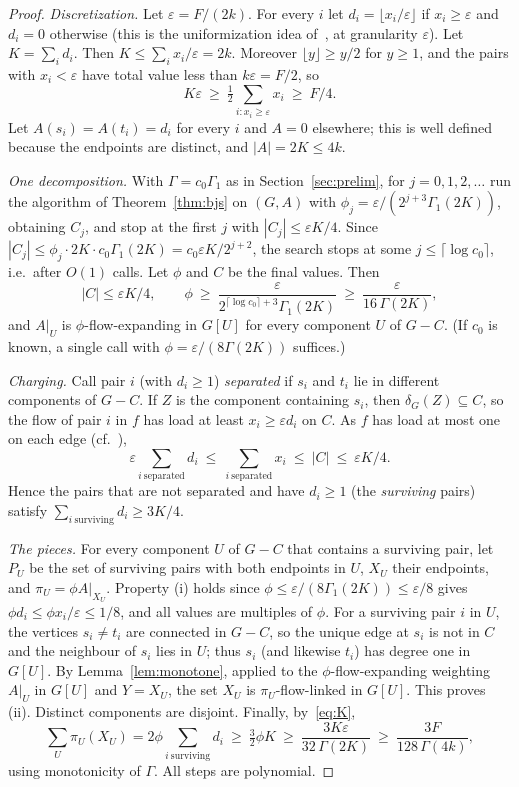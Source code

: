\documentclass[11pt,letterpaper]{article}
\theoremstyle{definition}
\newcommand{\eps}{\varepsilon}
\begin{document}
\begin{proof}
\emph{Discretization.} Let $\eps=F/(2k)$. For every $i$ let $d_i=\lfloor x_i/\eps\rfloor$ if
$x_i\ge\eps$ and $d_i=0$ otherwise (this is the uniformization idea
of~\cite[Lemma~1.1]{CKS05}, at granularity $\eps$). Let $K=\sum_id_i$. Then
$K\le\sum_ix_i/\eps=2k$. Moreover $\lfloor y\rfloor\ge y/2$ for $y\ge1$, and the pairs with
$x_i<\eps$ have total value less than $k\eps=F/2$, so
\begin{equation}\label{eq:K}
K\eps\ \ge\ \tfrac12\textstyle\sum_{i:x_i\ge\eps}x_i\ \ge\ F/4 .
\end{equation}
Let $A(s_i)=A(t_i)=d_i$ for every $i$ and $A=0$ elsewhere; this is well defined because the
endpoints are distinct, and $|A|=2K\le4k$.

\emph{One decomposition.} With $\Gamma=c_0\Gamma_1$ as in Section~\ref{sec:prelim}, for
$j=0,1,2,\dots$ run the algorithm of Theorem~\ref{thm:bjs} on $(G,A)$ with
$\phi_j=\eps/(2^{j+3}\Gamma_1(2K))$, obtaining $C_j$, and stop at the first $j$ with
$|C_j|\le\eps K/4$. Since $|C_j|\le\phi_j\cdot2K\cdot c_0\Gamma_1(2K)=c_0\eps K/2^{j+2}$, the
search stops at some $j\le\lceil\log c_0\rceil$, i.e.\ after $O(1)$ calls. Let $\phi$ and $C$
be the final values. Then
\[
|C|\le\eps K/4,\qquad \phi\ \ge\ \frac{\eps}{2^{\lceil\log c_0\rceil+3}\Gamma_1(2K)}\ \ge\
\frac{\eps}{16\,\Gamma(2K)},
\]
and $A|_U$ is $\phi$-flow-expanding in $G[U]$ for every component $U$ of $G-C$. (If $c_0$ is
known, a single call with $\phi=\eps/(8\Gamma(2K))$ suffices.)

\emph{Charging.} Call pair $i$ (with $d_i\ge1$) \emph{separated} if $s_i$ and $t_i$ lie in
different components of $G-C$. If $Z$ is the component containing $s_i$, then
$\delta_G(Z)\subseteq C$, so the flow of pair $i$ in $f$ has load at least $x_i\ge\eps d_i$ on
$C$. As $f$ has load at most one on each edge (cf.~\cite[Lemma~2.2]{CKS05}),
\[
\eps\textstyle\sum_{i\ \mathrm{separated}}d_i\ \le\ \sum_{i\ \mathrm{separated}}x_i\ \le\
|C|\ \le\ \eps K/4 .
\]
Hence the pairs that are not separated and have $d_i\ge1$ (the \emph{surviving} pairs) satisfy
$\sum_{i\ \mathrm{surviving}}d_i\ge3K/4$.

\emph{The pieces.} For every component $U$ of $G-C$ that contains a surviving pair, let $P_U$
be the set of surviving pairs with both endpoints in $U$, $X_U$ their endpoints, and
$\pi_U=\phi A|_{X_U}$. Property (i) holds since $\phi\le\eps/(8\Gamma_1(2K))\le\eps/8$ gives
$\phi d_i\le\phi x_i/\eps\le1/8$, and all values are multiples of $\phi$. For a surviving pair $i$ in $U$, the vertices $s_i\ne t_i$ are
connected in $G-C$, so the unique edge at $s_i$ is not in $C$ and the neighbour of $s_i$ lies in
$U$; thus $s_i$ (and likewise $t_i$) has degree one in $G[U]$. By Lemma~\ref{lem:monotone},
applied to the $\phi$-flow-expanding weighting $A|_U$ in $G[U]$ and $Y=X_U$, the set $X_U$ is
$\pi_U$-flow-linked in $G[U]$. This proves (ii). Distinct components are disjoint. Finally,
by~\eqref{eq:K},
\[
\sum_U\pi_U(X_U)=2\phi\sum_{i\ \mathrm{surviving}}d_i\ \ge\ \tfrac32\phi K\ \ge\
\frac{3K\eps}{32\,\Gamma(2K)}\ \ge\ \frac{3F}{128\,\Gamma(4k)},
\]
using monotonicity of $\Gamma$. All steps are polynomial.
\end{proof}
\end{document}
